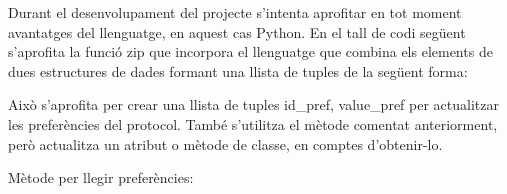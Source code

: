 \documentclass[letterpaper,11pt,catalan]{sphinxmanual}
\begin{document}
Durant el desenvolupament del projecte s'intenta aprofitar en tot moment avantatges
del llenguatge, en aquest cas Python. En el tall de codi següent s'aprofita la funció
zip que incorpora el llenguatge que combina els elements de dues estructures de dades
formant una llista de tuples de la següent forma:

\begin{sphinxVerbatim}[commandchars=\\\{\}]
  \PYG{p}{[}  \PYG{p}{]}
  \PYG{p}{[}  \PYG{p}{]}
  
\PYG{p}{[}
   
   
   
\PYG{p}{]}
\end{sphinxVerbatim}

Això s'aprofita per crear una llista de tuples id\_pref, value\_pref per actualitzar
les preferències del protocol.
També s'utilitza el mètode  comentat anteriorment, però actualitza un
atribut o mètode de classe, en comptes d'obtenir-lo.

Mètode per llegir preferències:

\begin{sphinxVerbatim}[commandchars=\\\{\}]
 
     
          
                  
                \PYG{p}{[}\PYG{p}{[}\PYG{p}{]}\PYG{p}{]}  \PYG{p}{[}\PYG{p}{]}
                 \PYG{p}{[}\PYG{p}{]} \PYG{p}{[}\PYG{p}{]}
\end{sphinxVerbatim}
\end{document}
